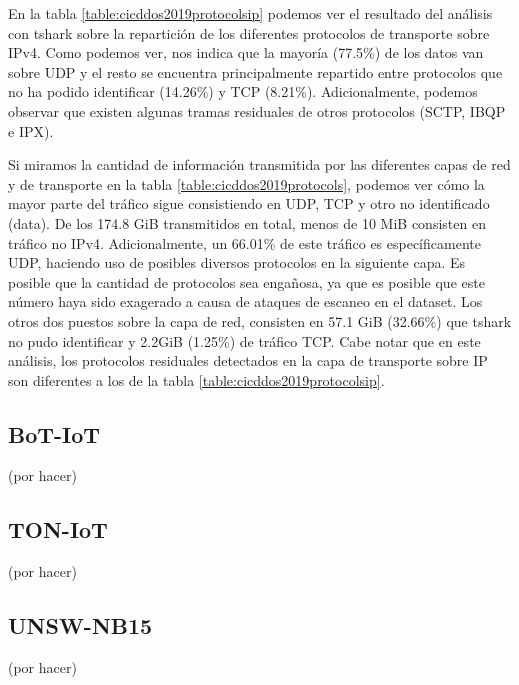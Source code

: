 En la tabla \ref{table:cicddos2019protocolsip} podemos ver el resultado del análisis con tshark sobre la repartición de los diferentes protocolos de transporte sobre IPv4. Como podemos ver, nos indica que la mayoría (77.5\%) de los datos van sobre UDP y el resto se encuentra principalmente repartido entre protocolos que no ha podido identificar (14.26\%) y TCP (8.21\%). Adicionalmente, podemos observar que existen algunas tramas residuales de otros protocolos (SCTP, IBQP e IPX).



Si miramos la cantidad de información transmitida por las diferentes capas de red y de transporte en la tabla \ref{table:cicddos2019protocols}, podemos ver cómo la mayor parte del tráfico sigue consistiendo en UDP, TCP y otro no identificado (data). De los 174.8 GiB transmitidos en total, menos de 10 MiB consisten en tráfico no IPv4. Adicionalmente, un 66.01\% de este tráfico es específicamente UDP, haciendo uso de posibles diversos protocolos en la siguiente capa. Es posible que la cantidad de protocolos sea engañosa, ya que es posible que este número haya sido exagerado a causa de ataques de escaneo en el dataset. Los otros dos puestos sobre la capa de red, consisten en 57.1 GiB (32.66\%) que tshark no pudo identificar y 2.2GiB (1.25\%) de tráfico TCP. Cabe notar que en este análisis, los protocolos residuales detectados en la capa de transporte sobre IP son diferentes a los de la tabla \ref{table:cicddos2019protocolsip}.



\subsection{BoT-IoT}

(por hacer)

\subsection{TON-IoT}

(por hacer)

\subsection{UNSW-NB15}

(por hacer)
